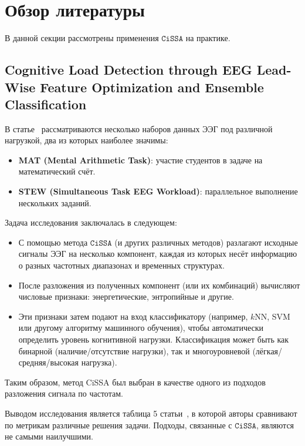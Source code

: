 \documentclass[12pt, specialist, subf
]{disser}
\theoremstyle{definition}
\newcommand{\CISSA}{\texttt{CiSSA}}
\begin{document}
\section{Обзор литературы}


В данной секции рассмотрены применения $\CISSA$ на практике.

\subsection{Cognitive Load Detection through EEG Lead-Wise Feature Optimization and Ensemble Classification}

В статье~\cite{cognitive} рассматриваются несколько наборов данных ЭЭГ под различной нагрузкой, два из которых наиболее значимы:

\begin{itemize}
	\item \textbf{MAT (Mental Arithmetic Task)}: участие студентов в задаче на математический счёт.
	\item \textbf{STEW (Simultaneous Task EEG Workload)}: параллельное выполнение нескольких заданий.
\end{itemize}

Задача исследования заключалась в следующем:

\begin{itemize}
	\item С помощью метода $\CISSA$ (и других различных методов) разлагают исходные сигналы ЭЭГ на несколько компонент, каждая из которых несёт информацию о разных частотных диапазонах и временных структурах.
	\item После разложения из полученных компонент (или их комбинаций) вычисляют числовые признаки: энергетические, энтропийные и другие.
	\item Эти признаки затем подают на вход классификатору (например, $k$NN, SVM или другому алгоритму машинного обучения), чтобы автоматически определить уровень когнитивной нагрузки. Классификация может быть как бинарной (наличие/отсутствие нагрузки), так и многоуровневой (лёгкая/средняя/высокая нагрузка).
\end{itemize}

Таким образом, метод CiSSA был выбран в качестве одного из подходов разложения сигнала по частотам.

Выводом исследования является таблица 5 статьи~\cite{cognitive}, в которой авторы сравнивают по метрикам различные решения задачи. Подходы, связанные с $\CISSA$, являются не самыми наилучшими.
\end{document}
